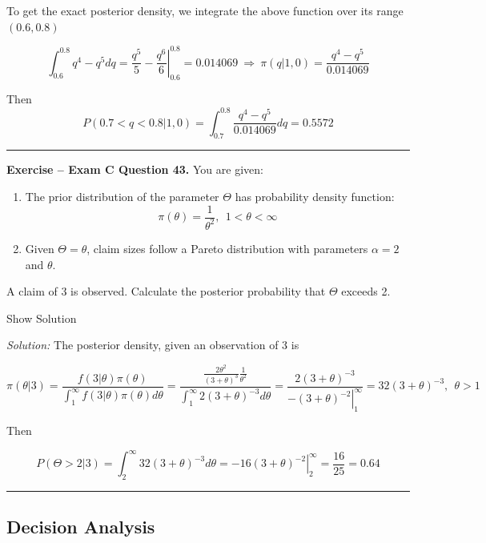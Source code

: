 \documentclass[]{book}
\providecommand{\tightlist}{%
  \setlength{\itemsep}{0pt}\setlength{\parskip}{0pt}}
\theoremstyle{definition}
\theoremstyle{definition}
\theoremstyle{definition}
\theoremstyle{remark}
\begin{document}
To get the exact posterior density, we integrate the above function over
its range \((0.6, 0.8)\)

\[\int_{0.6}^{0.8} q^4-q^5 dq = \frac{q^5}{5} - \left. \frac{q^6}{6} \right|_{0.6}^{0.8} = 0.014069 \ \Rightarrow \ \pi(q|1,0)=\frac{q^4-q^5}{0.014069}\]

Then
\[P(0.7<q<0.8|1,0)= \int_{0.7}^{0.8} \frac{q^4-q^5}{0.014069}dq = 0.5572\]

\begin{center}\rule{0.5\linewidth}{\linethickness}\end{center}

\textbf{Exercise -- Exam C Question 43.} You are given:

\begin{enumerate}
\def\labelenumi{(\roman{enumi})}
\tightlist
\item
  The prior distribution of the parameter \(\Theta\) has probability
  density function:
  \[\pi(\theta) = \frac{1}{\theta^2}, \ \ 1 < \theta < \infty\]
\item
  Given \(\Theta = \theta\), claim sizes follow a Pareto distribution
  with parameters \(\alpha=2\) and \(\theta\).
\end{enumerate}

A claim of 3 is observed. Calculate the posterior probability that
\(\Theta\) exceeds 2.

Show Solution

\hypertarget{toggleExamC43}{}
\emph{Solution:} The posterior density, given an observation of 3 is

\[\pi(\theta|3) =  \frac{f(3|\theta)\pi(\theta)}{\int_1^\infty f(3|\theta)\pi(\theta)d\theta} = 
\frac{\frac{2\theta^2}{(3+\theta)^3}\frac{1}{\theta^2}}{\int_1^\infty 2(3+\theta)^{-3} d\theta} = 
\frac{2(3+\theta)^{-3}}{\left. -(3+\theta)^{-2}\right|_1^\infty} = 32(3+\theta)^{-3}, \ \ \theta > 1\]

Then

\[P(\Theta>2|3) = \int_2^\infty 32(3+\theta)^{-3}d\theta = \left. -16(3+\theta)^{-2} \right|_2^\infty = \frac{16}{25} = 0.64\]

\begin{center}\rule{0.5\linewidth}{\linethickness}\end{center}

\subsection{Decision Analysis}\label{decision-analysis}
\end{document}
